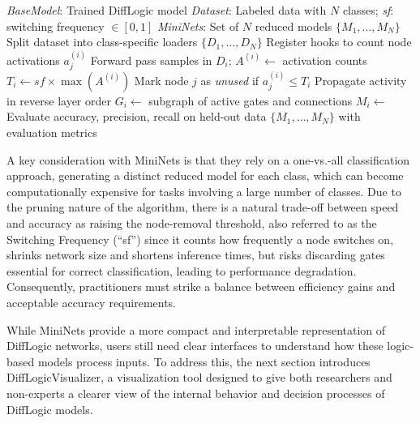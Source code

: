 \begin{algorithm}[H]
\caption{MiniNet Creation Pipeline for $N$ Classes}
\label{alg:mininet_pipeline_condensed}
\begin{algorithmbox}
\begin{algorithmic}[1]
\Require \textit{BaseModel}: Trained DiffLogic model
\Require \textit{Dataset}: Labeled data with $N$ classes; \textit{sf}: switching frequency $\in [0, 1]$
\Ensure \textit{MiniNets}: Set of $N$ reduced models $\{M_1, \ldots, M_N\}$
\State Split dataset into class-specific loaders $\{D_1, \ldots, D_N\}$
    \State Register hooks to count node activations $a_j^{(i)}$
    \State Forward pass samples in $D_i$; $A^{(i)} \gets$ activation counts
\EndFor
{}
    \State $T_i \gets sf \times \max(A^{(i)})$ %
    \State Mark node $j$ as \textit{unused} if $a_j^{(i)} \leq T_i$
\EndFor
{}
    \State Propagate activity in reverse layer order
    \State $G_i \gets$ subgraph of active gates and connections
\EndFor
{}
    \State $M_i \gets$  %
    \State Evaluate accuracy, precision, recall on held-out data
\EndFor
\State \Return $\{M_1, \ldots, M_N\}$ with evaluation metrics
\end{algorithmic}
\end{algorithmbox}
\end{algorithm}


A key consideration with MiniNets is that they rely on a one-vs.-all classification approach, generating a distinct reduced model for each class, which can become computationally expensive for tasks involving a large number of classes. Due to the pruning nature of the algorithm, there is a natural trade-off between speed and accuracy as raising the node-removal threshold, also referred to as the Switching Frequency (``sf'') since it counts how frequently a node switches on, shrinks network size and shortens inference times, but risks discarding gates essential for correct classification, leading to performance degradation. Consequently, practitioners must strike a balance between efficiency gains and acceptable accuracy requirements.

While MiniNets provide a more compact and interpretable representation of DiffLogic networks, users still need clear interfaces to understand how these logic-based models process inputs. To address this, the next section introduces DiffLogicVisualizer, a visualization tool designed to give both researchers and non-experts a clearer view of the internal behavior and decision processes of DiffLogic models.

